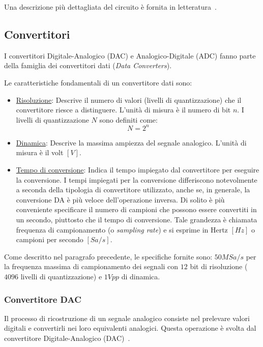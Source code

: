 Una descrizione più dettagliata del circuito è fornita in letteratura~\cite{thesissmldis}.

\subsection{Convertitori}
I convertitori Digitale-Analogico (DAC) e Analogico-Digitale (ADC) fanno parte della famiglia dei convertitori dati (\textit{Data Converters}).

Le caratteristiche fondamentali di un convertitore dati sono:
\begin{itemize}
	\item \underline{Risoluzione}: Descrive il numero di valori (livelli di quantizzazione) che il convertitore riesce a distinguere. L'unità di misura è il numero di bit $n$. I livelli di quantizzazione $N$ sono definiti come:
	\begin{equation}
		N=2^n
	\end{equation}
	\item \underline{Dinamica}: Descrive la massima ampiezza del segnale analogico. L'unità di misura è il volt $[V]$.
	\item \underline{Tempo di conversione}: Indica il tempo impiegato dal convertitore per eseguire la conversione. I tempi impiegati per la conversione differiscono notevolmente a seconda della tipologia di convertitore utilizzato, anche se, in generale, la conversione DA è più veloce dell'operazione inversa. Di solito è più conveniente specificare il numero di campioni che possono essere convertiti in un secondo, piuttosto che il tempo di conversione. Tale grandezza è chiamata frequenza di campionamento (o \textit{sampling rate}) e si esprime in Hertz $[Hz]$ o campioni per secondo $[Sa/s]$.
\end{itemize}

Come descritto nel paragrafo precedente, le specifiche fornite sono: $50MSa/s$ per la frequenza massima di campionamento dei segnali con $12$ bit di risoluzione ($4096$ livelli di quantizzazione) e $1 V{pp}$ di dinamica.

\subsubsection{Convertitore DAC}
Il processo di ricostruzione di un segnale analogico consiste nel prelevare valori digitali e convertirli nei loro equivalenti analogici. Questa operazione è svolta dal convertitore Digitale-Analogico (DAC)~\cite{storeyelet}.

